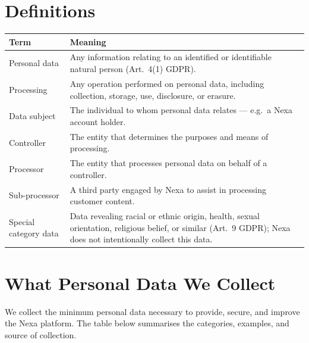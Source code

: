 \documentclass[11pt,a4paper]{scrartcl}
\begin{document}
\section{Definitions}

\begin{tabularx}{\linewidth}{@{}l Y@{}}
\toprule
\textbf{Term} & \textbf{Meaning} \\
\midrule
Personal data & Any information relating to an identified or identifiable natural person
  (Art.\ 4(1) GDPR). \\
Processing & Any operation performed on personal data, including collection, storage, use,
  disclosure, or erasure. \\
Data subject & The individual to whom personal data relates --- e.g.\ a Nexa account holder. \\
Controller & The entity that determines the purposes and means of processing. \\
Processor & The entity that processes personal data on behalf of a controller. \\
Sub-processor & A third party engaged by Nexa to assist in processing customer content. \\
Special category data & Data revealing racial or ethnic origin, health, sexual orientation,
  religious belief, or similar (Art.\ 9 GDPR); Nexa does not intentionally collect this
  data. \\
\bottomrule
\end{tabularx}

\section{What Personal Data We Collect}

We collect the minimum personal data necessary to provide, secure, and improve the Nexa
platform. The table below summarises the categories, examples, and source of collection.
\end{document}
